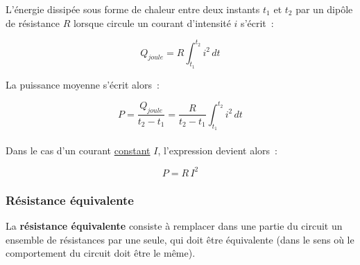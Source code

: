 L'énergie dissipée sous forme de chaleur entre deux instants $t_1$ et $t_2$ par un dipôle de résistance $R$ lorsque circule un courant d'intensité $i$ s'écrit~:

$$ Q_{joule} = R \int_{t_1}^{t_2} i^2\,dt $$

La puissance moyenne s'écrit alors~:

$$ P = \dfrac{Q_{joule}}{t_2 - t_1} = \dfrac{R}{t_2 - t_1} \int_{t_1}^{t_2}i^2\,dt $$\\

Dans le cas d'un courant \underline{constant} $I$, l'expression devient alors~:

\begin{equation}
	P = R\,I^2
\end{equation}

\subsubsection*{Résistance équivalente}

La \textbf{résistance équivalente} consiste à remplacer dans une partie du circuit un ensemble de résistances par une seule, qui doit être équivalente (dans le sens où le comportement du circuit doit être le même).\\ 

